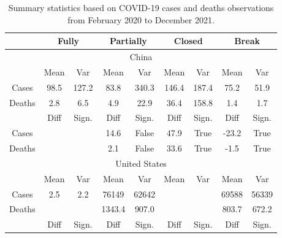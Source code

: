 \documentclass{article}
\begin{document}
\begin{table}[ht]
\centering

\caption{
Summary statistics based on COVID-19 cases and deaths observations from February 2020 to December 2021.  }

\begin{tabular}{ccccccccc}
\hline
       & \multicolumn{2}{c}{Fully} & \multicolumn{2}{c}{Partially} & \multicolumn{2}{c}{Closed} & \multicolumn{2}{c}{Break} \\ \hline
\multicolumn{9}{c}{China}                                                                                                                      \\ \hline
       & Mean          & Var       & Mean           & Var          & Mean       & Var      & Mean           & Var          \\ \hline
Cases  & 98.5          & 127.2          & 83.8           & 340.3             & 146.4      & 187.4         & 75.2           & 51.9              \\
Deaths & 2.8           & 6.5            & 4.9            & 22.9              & 36.4       & 158.8         & 1.4            & 1.7               \\ \hline
       & Diff          & Sign.          & Diff           & Sign.       & Diff       & Sign.   & Diff           & Sign.       \\ \hline
Cases  &               &                & 14.6           & False             & 47.9       & True          & -23.2          & True              \\
Deaths &               &                & 2.1            & False             & 33.6       & True          & -1.5           & True              \\ \hline
\multicolumn{9}{c}{United States}                                                                                                              \\ \hline
       & Mean          & Var       & Mean           & Var          & Mean       & Var      & Mean           & Var          \\ \hline
Cases  & 2.5           & 2.2            & 76149        & 62642           &            &               & 69588        & 56339           \\
Deaths &               &                & 1343.4         & 907.0             &            &               & 803.7          & 672.2             \\ \hline
       & Diff          & Sign.          & Diff           & Sign.       & Diff       & Sign.   & Diff           & Sign.       \\ \hline

\end{tabular}
\end{table}
\end{document}
